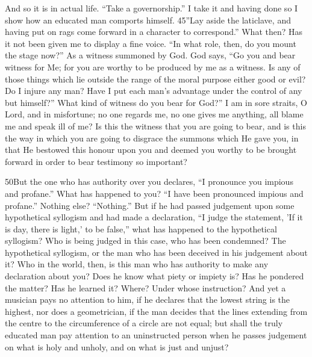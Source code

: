 And so it is in actual life. ``Take a governorship.'' I take it and having done so I show how an educated man comports himself. 45''Lay aside the laticlave, and having put on rags come forward in a character to correspond.'' What then? Has it not been given me to display a fine voice. ``In what role, then, do you mount the stage now?'' As a witness summoned by God. God says, ``Go you and bear witness for Me; for you are worthy to be produced by me as a witness. Is any of those things which lie outside the range of the moral purpose either good or evil? Do I injure any man? Have I put each man's advantage under the control of any but himself?'' What kind of witness do you bear for God?'' I am in sore straits, O Lord, and in misfortune; no one regards me, no one gives me anything, all blame me and speak ill of me? Is this the witness that you are going to bear, and is this the way in which you are going to disgrace the summons which He gave you, in that He bestowed this honour upon you and deemed you worthy to be brought forward in order to bear testimony so important?

50But the one who has authority over you declares, ``I pronounce you impious and profane.'' What has happened to you? ``I have been pronounced impious and profane.'' Nothing else? ``Nothing.'' But if he had passed judgement upon some hypothetical syllogism and had made a declaration, ``I judge the statement, 'If it is day, there is light,' to be false,'' what has happened to the hypothetical syllogism? Who is being judged in this case, who has been condemned? The hypothetical syllogism, or the man who has been deceived in his judgement about it? Who in the world, then, is this man who has authority to make any declaration about you? Does he know what piety or impiety is? Has he pondered the matter? Has he learned it? Where? Under whose instruction? And yet a musician pays no attention to him, if he declares that the lowest string is the highest, nor does a geometrician, if the man decides that the lines extending from the centre to the circumference of a circle are not equal; but shall the truly educated man pay attention to an uninstructed person when he passes judgement on what is holy and unholy, and on what is just and unjust?

